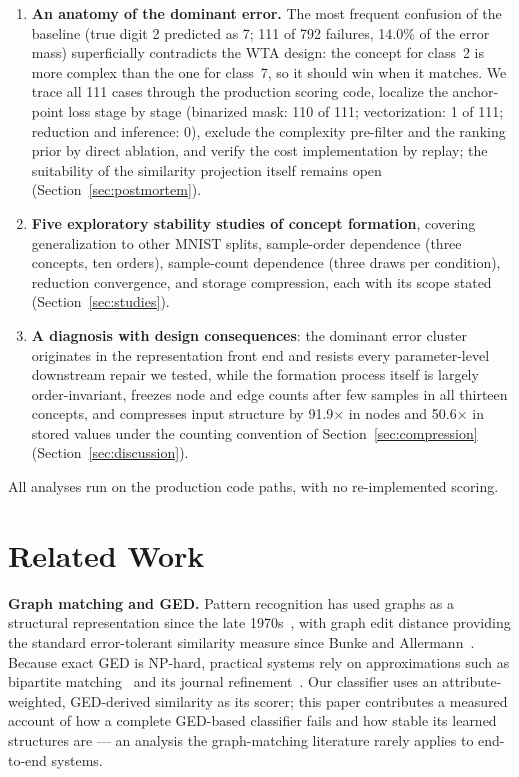\documentclass[conference]{IEEEtran}
\begin{document}
\begin{enumerate}
\item \textbf{An anatomy of the dominant error.} The most frequent
confusion of the baseline (true digit 2 predicted as 7; 111 of 792
failures, 14.0\% of the error mass)
superficially contradicts the WTA design: the concept for class~2 is
more complex than the one for class~7, so it should win when it
matches. We trace all 111 cases through the production scoring code,
localize the anchor-point loss stage by stage (binarized mask: 110 of 111;
vectorization: 1 of 111; reduction and inference: 0), exclude the
complexity pre-filter and the ranking prior by direct ablation, and verify
the cost implementation by replay; the suitability of the similarity
projection itself remains open (Section~\ref{sec:postmortem}).
\item \textbf{Five exploratory stability studies of concept formation},
covering generalization to other MNIST splits, sample-order dependence
(three concepts, ten orders), sample-count dependence (three draws per
condition), reduction convergence, and storage compression, each with its
scope stated (Section~\ref{sec:studies}).
\item \textbf{A diagnosis with design consequences}: the dominant error
cluster originates in the representation front end and resists every
parameter-level downstream repair we tested, while the
formation process itself is largely order-invariant, freezes node and edge
counts after few samples in all thirteen concepts, and compresses
input structure by 91.9$\times$ in nodes and 50.6$\times$ in stored values
under the counting convention of Section~\ref{sec:compression}
(Section~\ref{sec:discussion}).
\end{enumerate}

All analyses run on the production code paths, with no re-implemented
scoring.

\section{Related Work}
\label{sec:related}

\textbf{Graph matching and GED.} Pattern recognition has used graphs as a
structural representation since the late
1970s~\cite{conte2004thirty}, with graph edit distance providing the
standard error-tolerant similarity measure since Bunke and
Allermann~\cite{bunke1983inexact}. Because exact GED is NP-hard, practical
systems rely on approximations such as bipartite
matching~\cite{riesen2007bipartite} and its journal
refinement~\cite{riesen2009approx}. Our classifier uses an
attribute-weighted, GED-derived similarity as its scorer; this paper
contributes a measured account of how a complete GED-based classifier
fails and how stable its learned structures are --- an analysis the
graph-matching literature rarely applies to end-to-end systems.
\end{document}
